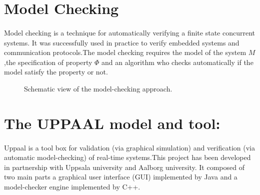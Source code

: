 \documentclass[10pt,a4paper]{article}
\author{Abdelaziz KHALED}
\begin{document}
\section{Model Checking}
\paragraph{}
Model checking is a technique for automatically verifying a finite state concurrent systems. It was successfully used in practice to verify embedded systems and communication protocols\cite{ref1}.The model checking requires the model of the system $M$,the specification of property $\Phi$ and an algorithm who checks automatically if the model satisfy the
property or not. 
\begin{center}
\begin{figure}[h]

\centering
{} 
\caption{Schematic view of the model-checking approach.}
\end{figure}
\end{center}

\section{The UPPAAL model and tool:}
\paragraph{}
Uppaal is a tool box for validation (via graphical simulation) and verification (via automatic model-checking) of real-time systems\cite{ref2}.This project has been developed in partnership with Uppsala university and Aalborg university. It composed of two main parts a graphical user interface (GUI) implemented by Java and a model-checker engine implemented by C++.
\end{document}
